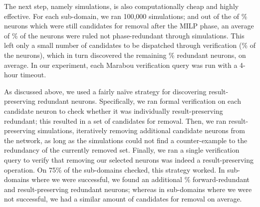 \documentclass[10pt, conference, twocolumn, compsocconf]{IEEEtran}
\theoremstyle{remark}
\begin{document}
The next step, namely simulations, is also computationally cheap and
highly effective.  For each sub-domain, we ran 100,000 simulations;
and out of the of \% neurons which were still
candidates for removal after the MILP phase, an average of
\statsNonRedBySim\% of the neurons were ruled not phase-redundant
through simulations. This left only a small number of candidates to be
dispatched through verification (\% of the neurons), which in turn discovered the
remaining \statsRedByFormal\% redundant neurons, on average. In our
experiment, each Marabou verification query was run with a 4-hour timeout. 


As discussed above, we used a fairly na\"ive strategy for discovering
result-preserving redundant neurons. Specifically, we ran formal
verification on each candidate neuron to check whether it was 
individually result-preserving redundant; this resulted in a set of 
candidates for removal.  Then, we ran result-preserving simulations, iteratively
removing additional candidate neurons from the network, as
long as the simulations could
not find a counter-example to the redundancy of the currently removed
set.
Finally, we ran a single verification query to verify that removing
our selected neurons was indeed a result-preserving operation.
On 75\% of the
sub-domains checked, this strategy worked. In sub-domains where we were
successful, we found an additional \% forward-redundant and result-preserving redundant neurons;
whereas in sub-domains where we were not successful, we had
a similar amount of candidates for removal on average.
%
%

\end{document}
